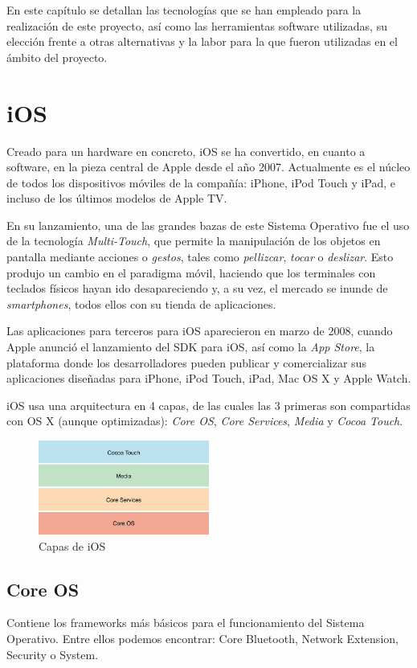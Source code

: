 En este capítulo se detallan las tecnologías que se han empleado para la realización de este proyecto, así como las herramientas software utilizadas, su elección frente a otras alternativas y la labor para la que fueron utilizadas en el ámbito del proyecto.

\section{iOS}
Creado para un hardware en concreto, iOS se ha convertido, en cuanto a software, en la pieza central de Apple desde el año 2007. Actualmente es el núcleo de todos los dispositivos móviles de la compañía: iPhone, iPod Touch y iPad, e incluso de los últimos modelos de Apple TV.

En su lanzamiento, una de las grandes bazas de este Sistema Operativo fue el uso de la tecnología \emph{Multi-Touch}, que permite la manipulación de los objetos en pantalla mediante acciones o \emph{gestos}, tales como \emph{pellizcar}, \emph{tocar} o \emph{deslizar}. Esto produjo un cambio en el paradigma móvil, haciendo que los terminales con teclados físicos hayan ido desapareciendo y, a su vez, el mercado se inunde de \emph{smartphones}, todos ellos con su tienda de aplicaciones.

Las aplicaciones para terceros para iOS aparecieron en marzo de 2008, cuando Apple anunció el lanzamiento del SDK para iOS, así como la \emph{App Store}, la plataforma donde los desarrolladores pueden publicar y comercializar sus aplicaciones diseñadas para iPhone, iPod Touch, iPad, Mac OS X y Apple Watch.

iOS usa una arquitectura en 4 capas, de las cuales las 3 primeras son compartidas con OS X (aunque optimizadas): \emph{Core OS}, \emph{Core Services}, \emph{Media} y \emph{Cocoa Touch}.

\begin{figure}[h]
	\centering
		\includegraphics[width=0.5\textwidth]{./img/ios-layers.png}
	\caption{Capas de iOS}
\end{figure}

\subsection*{Core OS}
Contiene los frameworks más básicos para el funcionamiento del Sistema Operativo. Entre ellos podemos encontrar: Core Bluetooth, Network Extension, Security o System.

